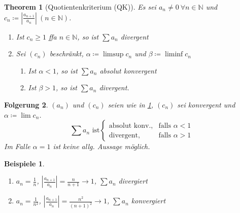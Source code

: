 \documentclass[14pt,titlepage,ngerman,a4paper,headsepline,DIV15,halfparskip*]{scrartcl}
\newcommand{\N}{\mathbb{N}}
\theoremstyle{named}
\newtheorem{namedtheorem}{Theorem} \counterwithin{namedtheorem}{section}
\theoremstyle{dotless}
\newtheorem{folg}[namedtheorem]{Folgerung}
\newtheorem*{beispiele}{Beispiele}
\begin{document}
\begin{namedtheorem}[Quotientenkriterium (QK)] \label{3.7:prop-Quotientenkriterium}
	Es sei $a_{n} \neq 0 ~\forall n \in \N$ und $c_{n} \coloneqq \left| \frac{a_{n+1}}{a_{n}} \right| ~(n \in \N)$.
	\begin{enumerate}
		\item Ist $c_{n} \geq 1$ ffa $n \in \N$, so ist $\sum a_{n}$ divergent
		\item Sei $(c_{n})$ beschränkt, $\alpha \coloneqq \limsup c_{n}$ und $\beta \coloneqq \liminf c_{n}$
			\begin{enumerate}
				\item Ist $\alpha < 1$, so ist $\sum a_{n}$ absolut konvergent
				\item Ist $\beta > 1$, so ist $\sum a_{n}$ divergent.
			\end{enumerate}
	\end{enumerate}
\end{namedtheorem}

\begin{folg} \label{3.8:folg}
	$(a_{n})$ und $(c_{n})$ seien wie in \ref{3.7:prop-Quotientenkriterium}, $(c_{n})$ sei konvergent und $\alpha \coloneqq \lim c_{n}$.
	$$ \sum a_{n} \text{ ist} \begin{cases} \text{absolut konv.}, & \text{falls } \alpha < 1 \\ \text{divergent}, & \text{falls } \alpha > 1 \end{cases} $$
	Im Falle $\alpha = 1$ ist keine allg. Aussage möglich.
\end{folg}


\begin{beispiele} ~\
	\begin{enumerate}
		\item $a_{n} = \frac{1}{n}$, $\left| \frac{a_{n+1}}{a_{n}} \right| = \frac{n}{n+1} \rightarrow 1$, $\sum a_{n}$ divergiert
		\item $a_{n} = \frac{1}{n^{2}}$, $ \left| \frac{a_{n+1}}{a_{n}} \right| = \frac{n^{2}}{(n+1)^{2}} \rightarrow 1$, $\sum a_{n}$ konvergiert 
	\end{enumerate}	
\end{beispiele}
\end{document}
